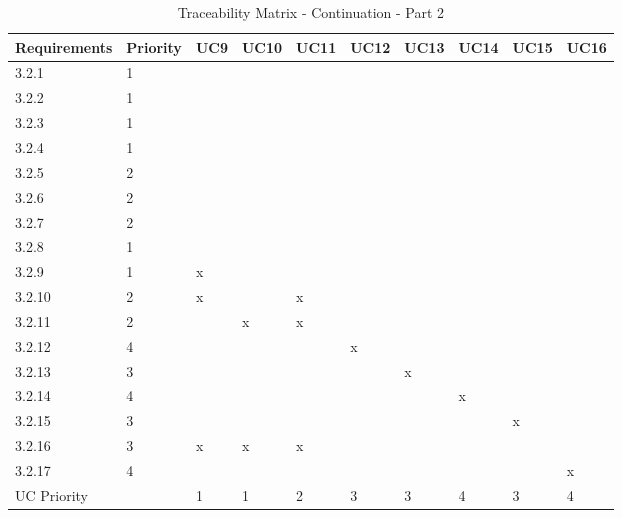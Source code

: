 \documentclass[runningheads,a4paper]{article}
\begin{document}
\begin{table}[H]
\centering

\label{my-label}
\begin{tabular}{|l|l|l|l|l|l|l|l|l|l|}
\hline
Requirements      & Priority      & UC9 & UC10 & UC11 & UC12 & UC13 & UC14 & UC15 & UC16 \\ \hline
3.2.1             & 1             &     &      &      &      &      &      &      &      \\ \hline
3.2.2             & 1             &     &      &      &      &      &      &      &      \\ \hline
3.2.3             & 1             &     &      &      &      &      &      &      &      \\ \hline
3.2.4             & 1             &     &      &      &      &      &      &      &      \\ \hline
3.2.5             & 2             &     &      &      &      &      &      &      &      \\ \hline
3.2.6             & 2             &     &      &      &      &      &      &      &      \\ \hline
3.2.7             & 2             &     &      &      &      &      &      &      &      \\ \hline
3.2.8             & 1             &     &      &      &      &      &      &      &      \\ \hline
3.2.9             & 1             & x   &      &      &      &      &      &      &      \\ \hline
3.2.10            & 2             & x   &      & x    &      &      &      &      &      \\ \hline
3.2.11            & 2             &     & x    & x    &      &      &      &      &      \\ \hline
3.2.12            & 4             &     &      &      & x    &      &      &      &      \\ \hline
3.2.13            & 3             &     &      &      &      & x    &      &      &      \\ \hline
3.2.14            & 4             &     &      &      &      &      & x    &      &      \\ \hline
3.2.15            & 3             &     &      &      &      &      &      & x    &      \\ \hline
3.2.16            & 3             & x   & x    & x    &      &      &      &      &      \\ \hline
3.2.17            & 4             &     &      &      &      &      &      &      & x    \\ \hline
\multicolumn{2}{|l|}{UC Priority} & 1   & 1    & 2    & 3    & 3    & 4    & 3    & 4    \\ \hline
\end{tabular}
\caption{Traceability Matrix - Continuation - Part 2}
\end{table}
\end{document}
